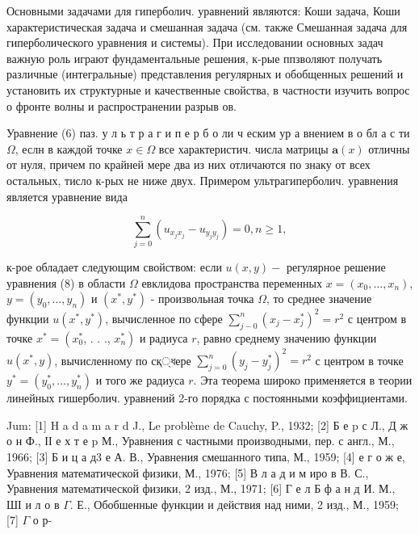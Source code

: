 \documentclass[10pt]{article}
\begin{document}
Основными задачами для гиперболич. уравнений являются: Коши задача, Коши характеристическая задача и смешанная задача (см. также Смешанная задача для гиперболического уравнения и системы). При исследовании основных задач важную роль играют фундаментальные решения, к-рые ппзволяют получать различные (интегральные) представления регулярных и обобщенных решений и установить их структурные и качественные свойства, в частности изучить вопрос о фронте волны и распространении разрыв ов.



Уравнение (6) паз. у л ь т р а г и п е р б о ли ч еским ур а внением в о бл а с ти $\Omega$, еслн в каждой точке $x \in \Omega$ все характеристич. числа матрицы $\boldsymbol{a}(x)$ отличны от нуля, причем по крайней мере два из них отличаются по знаку от всех остальных, тисло к-рых не ниже двух. Примером ультрагиперболич. уравнения является уравнение вида



\[

\sum_{j=0}^{n}\left(u_{x_{j} x_{j}}-u_{y_{j} y_{j}}\right)=0, n \geqslant 1,

\]



к-рое обладает следующим свойством: если $u(x, y)-$ регулярное решение уравнения (8) в области $\Omega$ евклидова пространства переменных $x=\left(x_{0}, \ldots, x_{n}\right)$, $y=\left(y_{0}, \ldots, y_{n}\right)$ и $\left(x^{*}, y^{*}\right)$ - произвольная точка $\Omega$, то среднее значение функции $u\left(x^{*}, y^{*}\right)$, вычисленное по сфере $\sum_{j-0}^{n}\left(x_{j}-x_{j}^{*}\right)^{2}=r^{2}$ с центром в точке $x^{*}=\left(x_{0}^{*}\right.$, . . ., $\left.x_{n}^{*}\right)$ и радиуса $r$, равно среднему значению функции $u\left(x^{*}, y\right)$, вычисленному по сқ্ধере $\sum_{j=0}^{n}\left(y_{j}-y_{j}^{*}\right)^{2}=r^{2}$ с центром в точке $y^{*}=\left(y_{0}^{*}, \ldots, y_{n}^{*}\right)$ и того же радиуса $r$. Эта теорема широко применяется в теории линейных гишерболич. уравнений 2-го порядка с постоянными коэффициентами.



Jum: [1] H a d a m a r d J., Le problème de Cauchy, P., 1932; [2] Б е p с Л., Д ж о н Ф., ІІ е х т е p М., Уравнения с частными производными, пер. с англ., М., 1966; [3] Б и ц а д3 е А. В., Уравнения смешанного типа, М., 1959; [4] е г о ж е, Уравнения математической физики, М., 1976; [5] В л а д и м иро в В. С., Уравнения математической физики, 2 изд., М., 1971; [6] Г е л Б ф а н д И. М., ШІ и л о в $\Gamma$. Е., Обобшенные функции и действия над ними, 2 изд., М., 1959; [7] $\Gamma$ о р-
\end{document}
